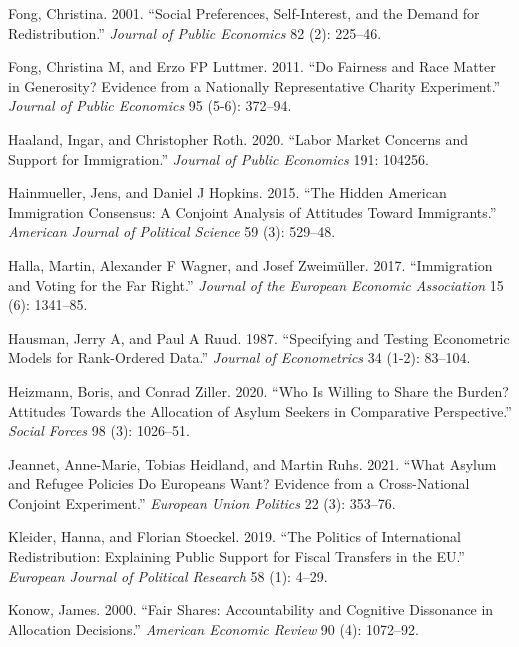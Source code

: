 \documentclass[
  12pt,
  a4paper,
]{article}
\newlength{\cslhangindent}
\newenvironment{CSLReferences}[2] %
 {\begin{list}{}{%
  \setlength{\itemindent}{0pt}
  \setlength{\leftmargin}{0pt}
  \setlength{\parsep}{0pt}
  \ifodd #1
   \setlength{\leftmargin}{\cslhangindent}
   \setlength{\itemindent}{-1\cslhangindent}
  \fi
  \setlength{\itemsep}{#2\baselineskip}}}
 {\end{list}}
\begin{document}
\begin{CSLReferences}{1}{0}
Fong, Christina. 2001. {``Social Preferences, Self-Interest, and the Demand for Redistribution.''} \emph{Journal of Public Economics} 82 (2): 225--46.

Fong, Christina M, and Erzo FP Luttmer. 2011. {``Do Fairness and Race Matter in Generosity? Evidence from a Nationally Representative Charity Experiment.''} \emph{Journal of Public Economics} 95 (5-6): 372--94.

Haaland, Ingar, and Christopher Roth. 2020. {``Labor Market Concerns and Support for Immigration.''} \emph{Journal of Public Economics} 191: 104256.

Hainmueller, Jens, and Daniel J Hopkins. 2015. {``The Hidden American Immigration Consensus: A Conjoint Analysis of Attitudes Toward Immigrants.''} \emph{American Journal of Political Science} 59 (3): 529--48.

Halla, Martin, Alexander F Wagner, and Josef Zweimüller. 2017. {``Immigration and Voting for the Far Right.''} \emph{Journal of the European Economic Association} 15 (6): 1341--85.

Hausman, Jerry A, and Paul A Ruud. 1987. {``Specifying and Testing Econometric Models for Rank-Ordered Data.''} \emph{Journal of Econometrics} 34 (1-2): 83--104.

Heizmann, Boris, and Conrad Ziller. 2020. {``Who Is Willing to Share the Burden? Attitudes Towards the Allocation of Asylum Seekers in Comparative Perspective.''} \emph{Social Forces} 98 (3): 1026--51.

Jeannet, Anne-Marie, Tobias Heidland, and Martin Ruhs. 2021. {``What Asylum and Refugee Policies Do Europeans Want? Evidence from a Cross-National Conjoint Experiment.''} \emph{European Union Politics} 22 (3): 353--76.

Kleider, Hanna, and Florian Stoeckel. 2019. {``The Politics of International Redistribution: Explaining Public Support for Fiscal Transfers in the EU.''} \emph{European Journal of Political Research} 58 (1): 4--29.

Konow, James. 2000. {``Fair Shares: Accountability and Cognitive Dissonance in Allocation Decisions.''} \emph{American Economic Review} 90 (4): 1072--92.


\end{CSLReferences}
\end{document}
